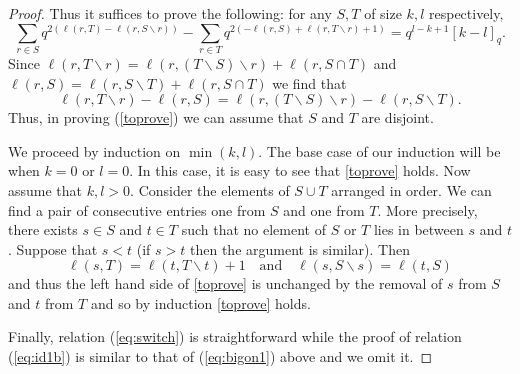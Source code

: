 \documentclass[11pt]{amsart}
\begin{document}
\begin{proof}
Thus it suffices to prove the following: for any $S,T$ of size $k, l $ respectively,
\begin{equation} \label{toprove}
 \sum_{r \in S} q^{2(\ell(r, T) - \ell(r, S \smallsetminus r))} - \sum_{r \in T} q^{2 (-\ell(r, S) + \ell(r, T \smallsetminus r) + 1)} = q^{l-k+1} [k-l]_q.
\end{equation}
Since $\ell(r, T \smallsetminus r) = \ell(r, (T \smallsetminus S) \smallsetminus r) + \ell(r, S \cap T)$ and $\ell(r,S) = \ell(r, S \smallsetminus T) + \ell(r, S \cap T)$ we find that 
$$\ell(r, T \smallsetminus r) - \ell(r,S) = \ell(r, (T \smallsetminus S) \smallsetminus r) - \ell(r, S \smallsetminus T).$$
Thus, in proving (\ref{toprove}) we can assume that $S$ and $T$ are disjoint.  

We proceed by induction on $\min(k,l)$.  The base case of our induction will be when $ k = 0 $ or $ l = 0 $.  In this case, it is easy to see that \eqref{toprove} holds. Now assume that $k,l > 0 $.  Consider the elements of $ S \cup T $ arranged in order.  We can find a pair of consecutive entries one from $ S $ and one from $ T $.  More precisely, there exists $ s \in S $ and $ t \in T $ such that no element of $ S $ or $ T $ lies in between $ s $ and $ t $.   Suppose that $ s < t$ (if $ s> t$ then the argument is similar).  Then
$$ \ell(s,T) = \ell(t, T \smallsetminus t) + 1 \ \ \ \text{ and } \ \ \  \ell(s, S \smallsetminus s) = \ell(t, S) $$
and thus the left hand side of \eqref{toprove} is unchanged by the removal of $ s $ from $ S $ and $ t $ from $ T $ and so by induction \eqref{toprove} holds.

Finally, relation (\ref{eq:switch}) is straightforward while the proof of relation (\ref{eq:id1b}) is similar to that of (\ref{eq:bigon1}) above and we omit it. 
\end{proof}
\end{document}
